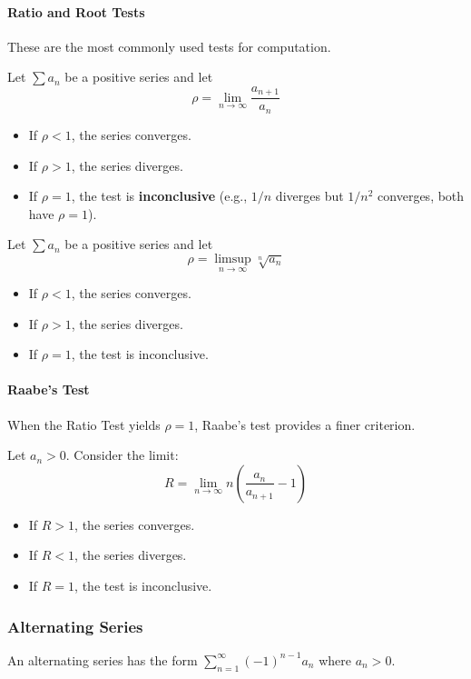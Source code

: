 \paragraph{Ratio and Root Tests}
These are the most commonly used tests for computation.

\begin{theorem}
Let $\sum a_n$ be a positive series and let
\[ \rho = \lim_{n \to \infty} \frac{a_{n+1}}{a_n} \]
\begin{itemize}
    \item If $\rho < 1$, the series converges.
    \item If $\rho > 1$, the series diverges.
    \item If $\rho = 1$, the test is \textbf{inconclusive} (e.g., $1/n$ diverges but $1/n^2$ converges, both have $\rho=1$).
\end{itemize}
\end{theorem}

\begin{theorem}
Let $\sum a_n$ be a positive series and let
\[ \rho = \limsup_{n \to \infty} \sqrt[n]{a_n} \]
\begin{itemize}
    \item If $\rho < 1$, the series converges.
    \item If $\rho > 1$, the series diverges.
    \item If $\rho = 1$, the test is inconclusive.
\end{itemize}
\end{theorem}

\paragraph{Raabe's Test}
When the Ratio Test yields $\rho = 1$, Raabe's test provides a finer criterion.

\begin{theorem}
Let $a_n > 0$. Consider the limit:
\[ R = \lim_{n \to \infty} n \left( \frac{a_n}{a_{n+1}} - 1 \right) \]
\begin{itemize}
    \item If $R > 1$, the series converges.
    \item If $R < 1$, the series diverges.
    \item If $R = 1$, the test is inconclusive.
\end{itemize}
\end{theorem}

\subsubsection{Alternating Series}
An alternating series has the form $\sum_{n=1}^{\infty} (-1)^{n-1} a_n$ where $a_n > 0$.

